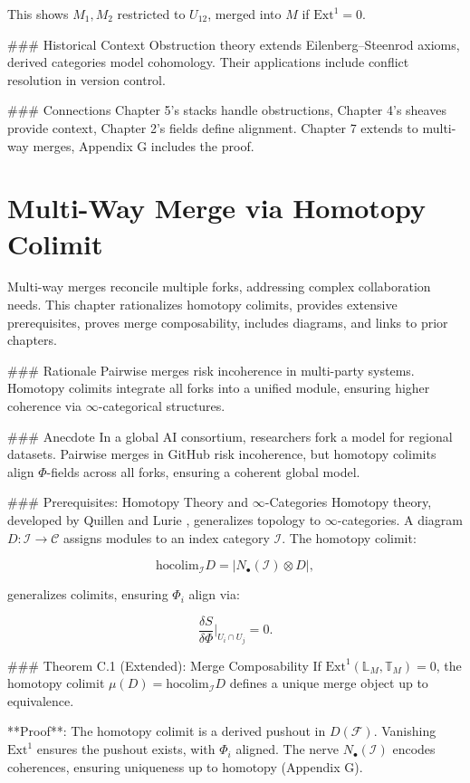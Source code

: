 \documentclass[12pt]{article}
\begin{document}
{This shows $M_1, M_2$ restricted to $U_{12}$, merged into $M$ if $\mathrm{Ext}^1 = 0$.

### Historical Context
Obstruction theory extends Eilenberg–Steenrod axioms, derived categories model cohomology. Their applications include conflict resolution in version control.

### Connections
Chapter 5’s stacks handle obstructions, Chapter 4’s sheaves provide context, Chapter 2’s fields define alignment. Chapter 7 extends to multi-way merges, Appendix G includes the proof.

\section{Multi-Way Merge via Homotopy Colimit}
\label{sec:chapter7}

Multi-way merges reconcile multiple forks, addressing complex collaboration needs. This chapter rationalizes homotopy colimits, provides extensive prerequisites, proves merge composability, includes diagrams, and links to prior chapters.

### Rationale
Pairwise merges risk incoherence in multi-party systems. Homotopy colimits integrate all forks into a unified module, ensuring higher coherence via $\infty$-categorical structures.

### Anecdote
In a global AI consortium, researchers fork a model for regional datasets. Pairwise merges in GitHub risk incoherence, but homotopy colimits align $\Phi$-fields across all forks, ensuring a coherent global model.

### Prerequisites: Homotopy Theory and $\infty$-Categories
Homotopy theory, developed by Quillen and Lurie \cite{lurie2009higher}, generalizes topology to $\infty$-categories. A diagram $D : \mathcal{I} \to \mathcal{C}$ assigns modules to an index category $\mathcal{I}$. The homotopy colimit:

\[
\mathrm{hocolim}_\mathcal{I} D = \left| N_\bullet(\mathcal{I}) \otimes D \right|,
\]

generalizes colimits, ensuring $\Phi_i$ align via:

\[
\frac{\delta S}{\delta \Phi}|_{U_i \cap U_j} = 0.
\]

### Theorem C.1 (Extended): Merge Composability
If $\mathrm{Ext}^1(\mathbb{L}_M, \mathbb{T}_M) = 0$, the homotopy colimit $\mu(D) = \mathrm{hocolim}_\mathcal{I} D$ defines a unique merge object up to equivalence.

**Proof**: The homotopy colimit is a derived pushout in $D(\mathcal{F})$. Vanishing $\mathrm{Ext}^1$ ensures the pushout exists, with $\Phi_i$ aligned. The nerve $N_\bullet(\mathcal{I})$ encodes coherences, ensuring uniqueness up to homotopy \cite{lurie2009higher} (Appendix G).

}
\end{document}
